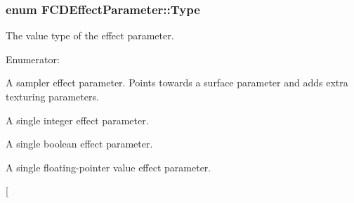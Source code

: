 \hypertarget{classFCDEffectParameter_a1efe74553d2ed199435085c171743b08}{
\subsubsection[{Type}]{\setlength{\rightskip}{0pt plus 5cm}enum {\bf FCDEffectParameter::Type}}}
\label{classFCDEffectParameter_a1efe74553d2ed199435085c171743b08}
The value type of the effect parameter. \begin{Desc}
\item[Enumerator: ]\par
\begin{description}
\item[{\em 
\hypertarget{classFCDEffectParameter_a1efe74553d2ed199435085c171743b08a8f5ddd923615701f05a30158b80f56ec}{
SAMPLER}
\label{classFCDEffectParameter_a1efe74553d2ed199435085c171743b08a8f5ddd923615701f05a30158b80f56ec}
}]A sampler effect parameter. Points towards a surface parameter and adds extra texturing parameters. \item[{\em 
\hypertarget{classFCDEffectParameter_a1efe74553d2ed199435085c171743b08add655617aa5a92725480964718122182}{
INTEGER}
\label{classFCDEffectParameter_a1efe74553d2ed199435085c171743b08add655617aa5a92725480964718122182}
}]A single integer effect parameter. \item[{\em 
\hypertarget{classFCDEffectParameter_a1efe74553d2ed199435085c171743b08ad40197d51fa800a31facae92a9dca91a}{
BOOLEAN}
\label{classFCDEffectParameter_a1efe74553d2ed199435085c171743b08ad40197d51fa800a31facae92a9dca91a}
}]A single boolean effect parameter. \item[{\em 
\hypertarget{classFCDEffectParameter_a1efe74553d2ed199435085c171743b08a87e8166fffd6cc3a8d39671b1346e469}{
FLOAT}
\label{classFCDEffectParameter_a1efe74553d2ed199435085c171743b08a87e8166fffd6cc3a8d39671b1346e469}
}]A single floating-\/pointer value effect parameter. \item[{\em 
}
\end{description}
\end{Desc}
